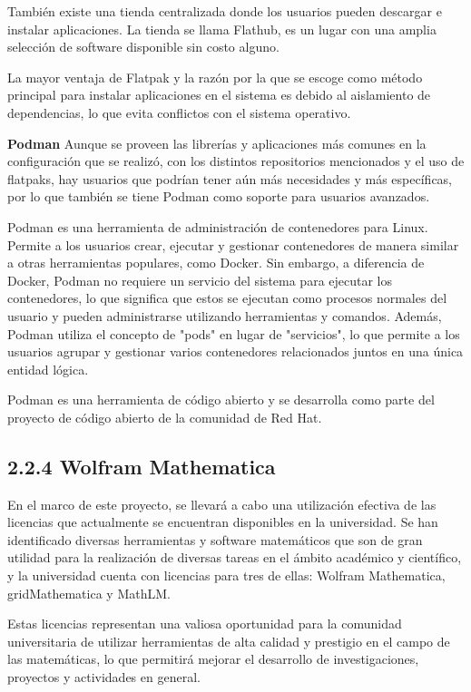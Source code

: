 \begin{doublespace}
\begin{multicols}{2}
    También existe una tienda centralizada donde los usuarios pueden descargar e instalar aplicaciones. La tienda se llama Flathub, es un lugar con una amplia selección de software disponible sin costo alguno.

    La mayor ventaja de Flatpak y la razón por la que se escoge como método principal para instalar aplicaciones en el sistema es debido al aislamiento de dependencias, lo que evita conflictos con el sistema operativo. \cite{FLAT-1} \cite{FLAT-2} \cite{RHEL-FLAT-1} \cite{PHOENIX-FLAT-1}

    \textbf{Podman}
    \newline
    Aunque se proveen las librerías y aplicaciones más comunes en la configuración que se realizó, con los distintos repositorios mencionados y el uso de flatpaks, hay usuarios que podrían tener aún más necesidades y más específicas, por lo que también se tiene Podman como soporte para usuarios avanzados.

    Podman es una herramienta de administración de contenedores para Linux. Permite a los usuarios crear, ejecutar y gestionar contenedores de manera similar a otras herramientas populares, como Docker. Sin embargo, a diferencia de Docker, Podman no requiere un servicio del sistema para ejecutar los contenedores, lo que significa que estos se ejecutan como procesos normales del usuario y pueden administrarse utilizando herramientas y comandos. Además, Podman utiliza el concepto de "pods" en lugar de "servicios", lo que permite a los usuarios agrupar y gestionar varios contenedores relacionados juntos en una única entidad lógica. 
    
    Podman es una herramienta de código abierto y se desarrolla como parte del proyecto de código abierto de la comunidad de Red Hat. \cite{RHEL-podman-1}

    \subsection{2.2.4 Wolfram Mathematica}

    En el marco de este proyecto, se llevará a cabo una utilización efectiva de las licencias que actualmente se encuentran disponibles en la universidad. Se han identificado diversas herramientas y software matemáticos que son de gran utilidad para la realización de diversas tareas en el ámbito académico y científico, y la universidad cuenta con licencias para tres de ellas: Wolfram Mathematica, gridMathematica y MathLM.

    Estas licencias representan una valiosa oportunidad para la comunidad universitaria de utilizar herramientas de alta calidad y prestigio en el campo de las matemáticas, lo que permitirá mejorar el desarrollo de investigaciones, proyectos y actividades en general.
    

\end{multicols}
\end{doublespace}
